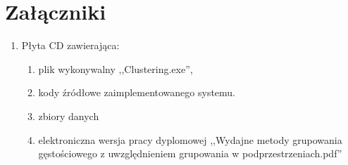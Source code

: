 \chapter*{Załączniki}
\begin{enumerate}
	\item Płyta CD zawierająca:
	\begin{enumerate}
		\item plik wykonywalny ,,Clustering.exe'',
		\item kody źródłowe zaimplementowanego systemu.
		\item zbiory danych
		\item elektroniczna wersja pracy dyplomowej ,,Wydajne metody grupowania gęstościowego z uwzględnieniem grupowania w podprzestrzeniach.pdf''
	\end{enumerate}
\end{enumerate}